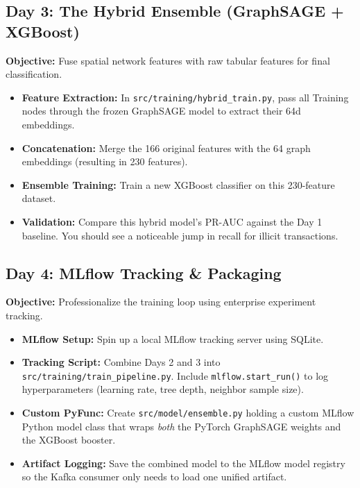 \documentclass[12pt,a4paper]{article}
\newcommand{\todo}{\ding{113}}
\begin{document}
\subsection{Day 3: The Hybrid Ensemble (GraphSAGE + XGBoost)}
\textbf{Objective:} Fuse spatial network features with raw tabular features for final classification.

\begin{itemize}
    \item[\todo] \textbf{Feature Extraction:} In \texttt{src/training/hybrid\_train.py}, pass all Training nodes through the frozen GraphSAGE model to extract their 64d embeddings.
    \item[\todo] \textbf{Concatenation:} Merge the 166 original features with the 64 graph embeddings (resulting in 230 features).
    \item[\todo] \textbf{Ensemble Training:} Train a new XGBoost classifier on this 230-feature dataset.
    \item[\todo] \textbf{Validation:} Compare this hybrid model's PR-AUC against the Day 1 baseline. You should see a noticeable jump in recall for illicit transactions.
\end{itemize}

\subsection{Day 4: MLflow Tracking \& Packaging}
\textbf{Objective:} Professionalize the training loop using enterprise experiment tracking.

\begin{itemize}
    \item[\todo] \textbf{MLflow Setup:} Spin up a local MLflow tracking server using SQLite.
    \item[\todo] \textbf{Tracking Script:} Combine Days 2 and 3 into \texttt{src/training/train\_pipeline.py}. Include \texttt{mlflow.start\_run()} to log hyperparameters (learning rate, tree depth, neighbor sample size).
    \item[\todo] \textbf{Custom PyFunc:} Create \texttt{src/model/ensemble.py} holding a custom MLflow Python model class that wraps \textit{both} the PyTorch GraphSAGE weights and the XGBoost booster. 
    \item[\todo] \textbf{Artifact Logging:} Save the combined model to the MLflow model registry so the Kafka consumer only needs to load one unified artifact.
\end{itemize}
\end{document}

